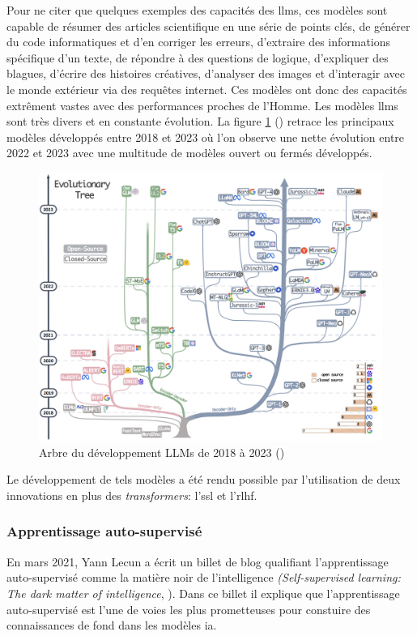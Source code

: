Pour ne citer que quelques exemples des capacités des \gls{llms}, ces modèles sont capable de résumer des articles scientifique en une série de points clés, de générer du code informatiques et d'en corriger les erreurs, d'extraire des informations spécifique d'un texte, de répondre à des questions de logique, d'expliquer des blagues, d'écrire des histoires créatives, d'analyser des images et d'interagir avec le monde extérieur via des requêtes internet. Ces modèles ont donc des capacités extrêment vastes avec des performances proches de l'Homme. Les modèles \gls{llms} sont très divers et en constante évolution. La figure \ref{fig:llm-tree} (\cite{yang_harnessing_2023}) retrace les principaux modèles développés entre 2018 et 2023 où l'on observe une nette évolution entre 2022 et 2023 avec une multitude de modèles ouvert ou fermés développés.
\begin{figure}[!htbp]
 \centering
 \includegraphics[width=1\textwidth]{figures/llm_tree.png}
 \caption[Arbre du développement LLMs de 2018 à 2023 (\cite{yang_harnessing_2023})]{Arbre du développement LLMs de 2018 à 2023 (\cite{yang_harnessing_2023})}
 \label{fig:llm-tree}
\end{figure}
Le développement de tels modèles a été rendu possible par l'utilisation de deux innovations en plus des \textit{transformers}: l'\gls{ssl} et l'\gls{rlhf}.

\subsubsection{Apprentissage auto-supervisé}
En mars 2021, Yann Lecun a écrit un billet de blog qualifiant l'apprentissage auto-supervisé comme la matière noir de l'intelligence \textit{(Self-supervised learning: The dark matter of intelligence}, \cite{lecun_self-supervised_2021}). Dans ce billet il explique que l'apprentissage auto-supervisé est l'une de voies les plus prometteuses pour constuire des connaissances de fond dans les modèles \gls{ia}.


